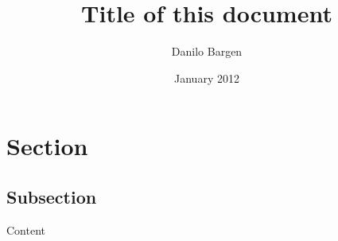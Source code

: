 


\subject{Subject}
\title{Title of this document}
\author{Danilo Bargen}
\date{January 2012}








\section{Section}

\subsection{Subsection}

Content


